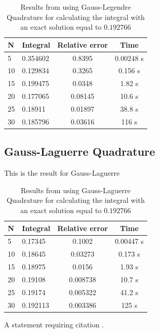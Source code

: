 \documentclass[twoside,twocolumn]{article}
\begin{document}
\begin{table}[h]
\centering
\begin{tabular}{|l|l|c|c|}
\hline
N  & Integral & \multicolumn{1}{l|}{Relative error} & Time      \\ \hline
5  & 0.354602 & 0.8395                              & 0.00248 s \\ \hline
10 & 0.129834 & 0.3265                              & 0.156 s   \\ \hline
15 & 0.199475 & 0.0348                              & 1.82 s    \\ \hline
20 & 0.177065 & 0.08145                             & 10.6 s    \\ \hline
25 & 0.18911  & 0.01897                             & 38.8 s    \\ \hline
30 & 0.185796 & 0.03616                             & 116 s     \\ \hline
\end{tabular}
\caption{Results from using Gauss-Legendre Quadrature for calculating the integral with an exact solution equal to $0.192766$}
\end{table}


\subsection{Gauss-Laguerre Quadrature}
This is the result for Gauss-Laguerre 

\begin{table}[h]
\centering
\begin{tabular}{|l|l|c|c|}
\hline
N  & Integral & \multicolumn{1}{l|}{Relative error} & Time      \\ \hline
5  & 0.17345  & 0.1002                              & 0.00447 s \\ \hline
10 & 0.18645  & 0.03273                             & 0.173 s   \\ \hline
15 & 0.18975  & 0.0156                              & 1.93 s    \\ \hline
20 & 0.19108  & 0.008738                            & 10.7 s    \\ \hline
25 & 0.19174  & 0.005322                            & 41.2 s    \\ \hline
30 & 0.192113 & 0.003386                            & 125 s     \\ \hline
\end{tabular}
\caption{Results from using Gauss-Laguerre Quadrature for calculating the integral with an exact solution equal to $0.192766$}
\end{table}
A statement requiring citation \cite{Figueredo:2009dg}.
\blindtext %
\end{document}
